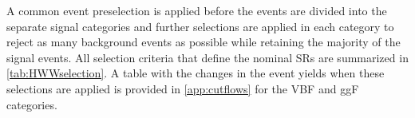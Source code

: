 



A common event preselection is applied before the events are divided into the separate signal categories and further selections are applied in each category to reject as many background events as possible while retaining the majority of the signal events.
All selection criteria that define the nominal SRs are summarized in \cref{tab:HWWselection}. 
A table with the changes in the event yields when these selections are applied is provided in \cref{app:cutflows} for the VBF and ggF \TwoJet categories. 

\begin{table}[!ht]
    \centering
    \caption{
    Event selection criteria used to define the nominal SRs in the \hww\ analysis. The definitions of the variables can be found in the text.
    \label{tab:HWWselection}
    }
    \resizebox{\textwidth}{!}{
    
    }
\end{table}

